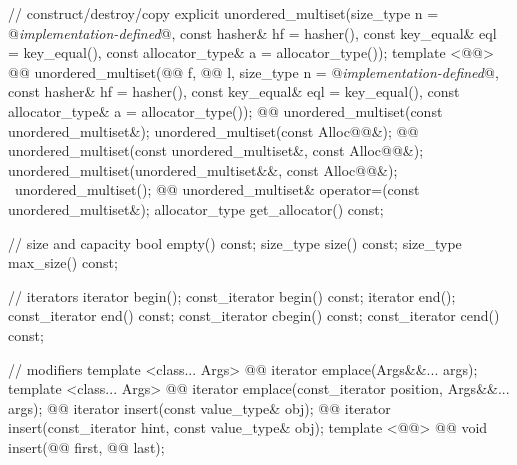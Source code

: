 \documentclass[american,twoside]{book}
\begin{document}
\begin{codeblock}
{{    // construct/destroy/copy
    explicit unordered_multiset(size_type n = @\textit{implementation-defined}@,
                                const hasher& hf = hasher(),
                                const key_equal& eql = key_equal(),
                                const allocator_type& a = allocator_type());
    template <@@>
      @@
      unordered_multiset(@@ f, @@ l,
                         size_type n = @\textit{implementation-defined}@,
                         const hasher& hf = hasher(),
                         const key_equal& eql = key_equal(),
                         const allocator_type& a = allocator_type());
    @@ 
      unordered_multiset(const unordered_multiset&);
    unordered_multiset(const Alloc@@&);
    @@ 
      unordered_multiset(const unordered_multiset&, const Alloc@@&);
    unordered_multiset(unordered_multiset&&, const Alloc@@&);
    ~unordered_multiset();
    @@
      unordered_multiset& operator=(const unordered_multiset&);
    allocator_type get_allocator() const;

    // size and capacity
    bool empty() const;
    size_type size() const;
    size_type max_size() const;

    // iterators
    iterator       begin();
    const_iterator begin() const;
    iterator       end();
    const_iterator end() const;
    const_iterator cbegin() const;
    const_iterator cend() const;

    // modifiers
    template <class... Args> 
      @@
      iterator emplace(Args&&... args);
    template <class... Args> 
      @@
      iterator emplace(const_iterator position, Args&&... args);
    @@ 
      iterator insert(const value_type& obj);
    @@ 
      iterator insert(const_iterator hint, const value_type& obj);
    template <@@> 
      @@
      void insert(@@ first, @@ last);

}}
\end{codeblock}
\end{document}
